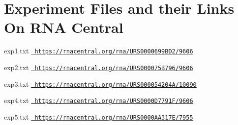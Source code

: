 \chapter{Experiment Files and their Links On RNA Central}
\hypertarget{md__c_1_2_users_2adapa_2_acads_01_b_p_h_c_24-2_2daa_2asgn2_2_r_n_a-_matching-_d_p-_algo_2_exp___file___links}{}\label{md__c_1_2_users_2adapa_2_acads_01_b_p_h_c_24-2_2daa_2asgn2_2_r_n_a-_matching-_d_p-_algo_2_exp___file___links}
\label{md__c_1_2_users_2adapa_2_acads_01_b_p_h_c_24-2_2daa_2asgn2_2_r_n_a-_matching-_d_p-_algo_2_exp___file___links_autotoc_md0}%
%

\begin{DoxyItemize}
\item exp1.\+txt \href{https://rnacentral.org/rna/URS0000699BD2/9606}{\texttt{ https\+://rnacentral.\+org/rna/\+URS0000699\+BD2/9606}}
\item exp2.\+txt \href{https://rnacentral.org/rna/URS000075B796/9606}{\texttt{ https\+://rnacentral.\+org/rna/\+URS000075\+B796/9606}}
\item exp3.\+txt \href{https://rnacentral.org/rna/URS000054204A/10090}{\texttt{ https\+://rnacentral.\+org/rna/\+URS000054204\+A/10090}}
\item exp4.\+txt \href{https://rnacentral.org/rna/URS0000D7791F/9606}{\texttt{ https\+://rnacentral.\+org/rna/\+URS0000\+D7791\+F/9606}}
\item exp5.\+txt \href{https://rnacentral.org/rna/URS0000AA317E/7955}{\texttt{ https\+://rnacentral.\+org/rna/\+URS0000\+AA317\+E/7955}} 
\end{DoxyItemize}